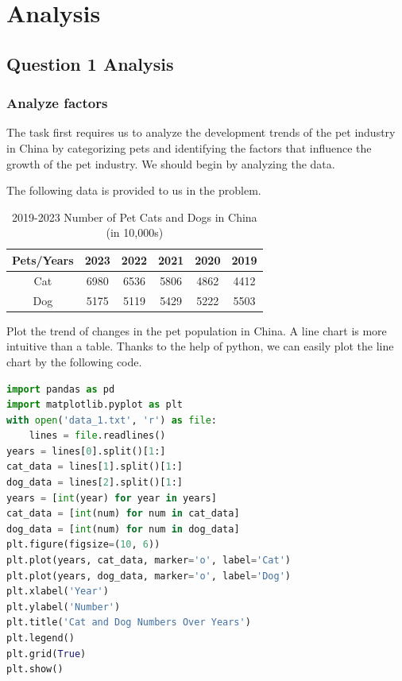 \documentclass[withoutpreface,bwprint]{cumcmthesis} %
\begin{document}
\section{Analysis}

\subsection{Question 1 Analysis}
\subsubsection{Analyze factors}
The task first requires us to analyze the development trends of the pet industry in China by categorizing pets 
and identifying the factors that influence the growth of the pet industry.
We should begin by analyzing the data.
\par The following data is provided to us in the problem.
\begin{table}[!htbp]
    \caption{2019-2023 Number of Pet Cats and Dogs in China (in 10,000s)} \centering
    \begin{tabular}{cccccc}
    \toprule[1.5pt]
    Pets/Years & 2023 & 2022 & 2021 & 2020 & 2019 \\
    \midrule[1pt]
    Cat & 6980 & 6536 & 5806 & 4862 & 4412 \\
    Dog & 5175 & 5119 & 5429 & 5222 & 5503 \\
    \bottomrule[1.5pt]
    \end{tabular}
    \end{table}
\par Plot the trend of changes in the pet population in China. 
A line chart is more intuitive than a table.
Thanks to the help of python, we can easily plot the line chart by the following code.
\begin{lstlisting}[language=python]
import pandas as pd
import matplotlib.pyplot as plt
with open('data_1.txt', 'r') as file:
    lines = file.readlines()
years = lines[0].split()[1:]
cat_data = lines[1].split()[1:]
dog_data = lines[2].split()[1:]
years = [int(year) for year in years]
cat_data = [int(num) for num in cat_data]
dog_data = [int(num) for num in dog_data]
plt.figure(figsize=(10, 6))
plt.plot(years, cat_data, marker='o', label='Cat')
plt.plot(years, dog_data, marker='o', label='Dog')
plt.xlabel('Year')
plt.ylabel('Number')
plt.title('Cat and Dog Numbers Over Years')
plt.legend()
plt.grid(True)
plt.show()
\end{lstlisting}
\end{document}
